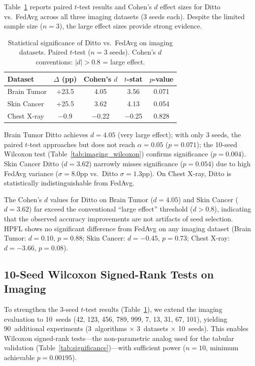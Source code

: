 \documentclass[conference]{IEEEtran}
\begin{document}
Table~\ref{tab:imaging_significance} reports paired $t$-test results and Cohen's $d$ effect sizes for Ditto vs.\ FedAvg across all three imaging datasets (3 seeds each). Despite the limited sample size ($n{=}3$), the large effect sizes provide strong evidence.

\begin{table}[htbp]
\centering
\caption{Statistical significance of Ditto vs.\ FedAvg on imaging datasets. Paired $t$-test ($n{=}3$ seeds). Cohen's $d$ conventions: $|d|{>}0.8$ = large effect.}
\label{tab:imaging_significance}
\small
\begin{tabular}{lcccc}
\toprule
\textbf{Dataset} & \textbf{$\Delta$ (pp)} & \textbf{Cohen's $d$} & \textbf{$t$-stat} & \textbf{$p$-value} \\
\midrule
Brain Tumor & $+$23.5 & 4.05 & 3.56 & 0.071 \\
Skin Cancer & $+$25.5 & 3.62 & 4.13 & 0.054 \\
Chest X-ray & $-$0.9 & $-$0.22 & $-$0.25 & 0.828 \\
\bottomrule
\end{tabular}
\par{\footnotesize Brain Tumor Ditto achieves $d{=}4.05$ (very large effect); with only 3 seeds, the paired $t$-test approaches but does not reach $\alpha{=}0.05$ ($p{=}0.071$); the 10-seed Wilcoxon test (Table~\ref{tab:imaging_wilcoxon}) confirms significance ($p{=}0.004$). Skin Cancer Ditto ($d{=}3.62$) narrowly misses significance ($p{=}0.054$) due to high FedAvg variance ($\sigma{=}8.0$pp vs.\ Ditto $\sigma{=}1.3$pp). On Chest X-ray, Ditto is statistically indistinguishable from FedAvg.}
\end{table}

The Cohen's $d$ values for Ditto on Brain Tumor ($d{=}4.05$) and Skin Cancer ($d{=}3.62$) far exceed the conventional ``large effect'' threshold ($d{>}0.8$), indicating that the observed accuracy improvements are not artifacts of seed selection. HPFL shows no significant difference from FedAvg on any imaging dataset (Brain Tumor: $d{=}0.10$, $p{=}0.88$; Skin Cancer: $d{=}-0.45$, $p{=}0.73$; Chest X-ray: $d{=}-3.66$, $p{=}0.08$).


\subsection{10-Seed Wilcoxon Signed-Rank Tests on Imaging}
\label{sec:imaging_wilcoxon}

To strengthen the 3-seed $t$-test results (Table~\ref{tab:imaging_significance}), we extend the imaging evaluation to 10~seeds (42, 123, 456, 789, 999, 7, 13, 31, 67, 101), yielding 90~additional experiments (3~algorithms $\times$ 3~datasets $\times$ 10~seeds). This enables Wilcoxon signed-rank tests---the non-parametric analog used for the tabular validation (Table~\ref{tab:significance})---with sufficient power ($n{=}10$, minimum achievable $p = 0.00195$).
\end{document}
